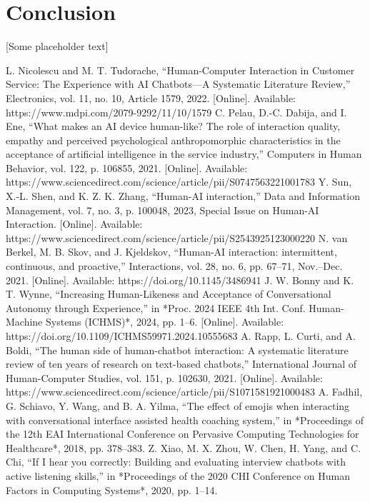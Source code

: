 \documentclass[conference]{IEEEtran}
\begin{document}
\section{Conclusion}
 [Some placeholder text]


\begin{thebibliography}{00}
	 L. Nicolescu and M. T. Tudorache, ``Human-Computer Interaction in Customer Service: The Experience with AI Chatbots—A Systematic Literature Review,'' Electronics, vol. 11, no. 10, Article 1579, 2022. [Online]. Available: https://www.mdpi.com/2079-9292/11/10/1579
	 C. Pelau, D.-C. Dabija, and I. Ene, ``What makes an AI device human-like? The role of interaction quality, empathy and perceived psychological anthropomorphic characteristics in the acceptance of artificial intelligence in the service industry,'' Computers in Human Behavior, vol. 122, p. 106855, 2021. [Online]. Available: https://www.sciencedirect.com/science/article/pii/S0747563221001783
	 Y. Sun, X.-L. Shen, and K. Z. K. Zhang, ``Human-AI interaction,'' Data and Information Management, vol. 7, no. 3, p. 100048, 2023, Special Issue on Human-AI Interaction. [Online]. Available: https://www.sciencedirect.com/science/article/pii/S2543925123000220
	 N. van Berkel, M. B. Skov, and J. Kjeldskov, ``Human-AI interaction: intermittent, continuous, and proactive,'' Interactions, vol. 28, no. 6, pp. 67–71, Nov.–Dec. 2021. [Online]. Available: https://doi.org/10.1145/3486941
	 J. W. Bonny and K. T. Wynne, ``Increasing Human-Likeness and Acceptance of Conversational Autonomy through Experience,'' in *Proc. 2024 IEEE 4th Int. Conf. Human-Machine Systems (ICHMS)*, 2024, pp. 1–6. [Online]. Available: https://doi.org/10.1109/ICHMS59971.2024.10555683
	 A. Rapp, L. Curti, and A. Boldi, ``The human side of human-chatbot interaction: A systematic literature review of ten years of research on text-based chatbots,'' International Journal of Human-Computer Studies, vol. 151, p. 102630, 2021. [Online]. Available: https://www.sciencedirect.com/science/article/pii/S1071581921000483
     A. Fadhil, G. Schiavo, Y. Wang, and B. A. Yilma, ``The effect of emojis when interacting with conversational interface assisted health coaching system,'' in *Proceedings of the 12th EAI International Conference on Pervasive Computing Technologies for Healthcare*, 2018, pp. 378--383.
     Z. Xiao, M. X. Zhou, W. Chen, H. Yang, and C. Chi, ``If I hear you correctly: Building and evaluating interview chatbots with active listening skills,'' in *Proceedings of the 2020 CHI Conference on Human Factors in Computing Systems*, 2020, pp. 1--14.

\end{thebibliography}
\end{document}
